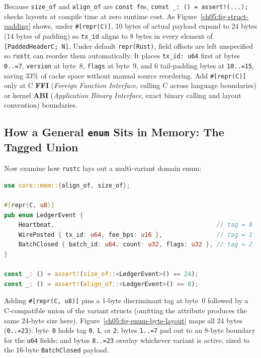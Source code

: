 Because \texttt{size\_of} and \texttt{align\_of} are \texttt{const fn}s, \texttt{const \_: () = assert!(...);} checks layouts at compile time at zero runtime cost. As Figure~\ref{ch05:fig-struct-padding} shows, under \texttt{\#[repr(C)]}, 10 bytes of actual payload expand to 24 bytes (14 bytes of padding) so \texttt{tx\_id} aligns to 8 bytes in every element of \texttt{[PaddedHeaderC; N]}. Under default \texttt{repr(Rust)}, field offsets are left unspecified so \texttt{rustc} can reorder them automatically. It places \texttt{tx\_id: u64} first at bytes \texttt{0..=7}, \texttt{version} at byte~8, \texttt{flags} at byte~9, and 6 tail-padding bytes at \texttt{10..=15}, saving 33\% of cache space without manual source reordering. Add \texttt{\#[repr(C)]} only at C \textbf{FFI} (\emph{Foreign Function Interface}, calling C across language boundaries) or kernel \textbf{ABI} (\emph{Application Binary Interface}, exact binary calling and layout convention) boundaries.

\subsection{How a General \texttt{enum} Sits in Memory: The Tagged Union}
\label{ch05:tagged-union-layout}

Now examine how \texttt{rustc} lays out a multi-variant domain enum:

\begin{lstlisting}[language=Rust]
use core::mem::{align_of, size_of};

#[repr(C, u8)]
pub enum LedgerEvent {
    Heartbeat,                                             // tag = 0
    WirePosted { tx_id: u64, fee_bps: u16 },               // tag = 1
    BatchClosed { batch_id: u64, count: u32, flags: u32 }, // tag = 2
}

const _: () = assert!(size_of::<LedgerEvent>() == 24);
const _: () = assert!(align_of::<LedgerEvent>() == 8);
\end{lstlisting}

Adding \texttt{\#[repr(C, u8)]} pins a 1-byte discriminant tag at byte~0 followed by a C-compatible union of the variant structs (omitting the attribute produces the same 24-byte size here). Figure~\ref{ch05:fig-enum-byte-layout} maps all 24 bytes (\texttt{0..=23}): byte~\texttt{0} holds tag \texttt{0}, \texttt{1}, or \texttt{2}; bytes \texttt{1..=7} pad out to an 8-byte boundary for the \texttt{u64} fields; and bytes \texttt{8..=23} overlay whichever variant is active, sized to the 16-byte \texttt{BatchClosed} payload.

